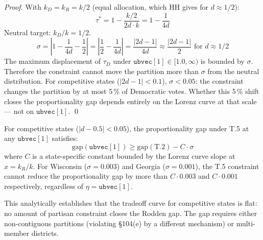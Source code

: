 \begin{proof}
With $k_D = k_R = k/2$ (equal allocation, which HH gives for $d \approx 1/2$):
\[
  \tau^* = 1 - \frac{k/2}{2d \cdot k} = 1 - \frac{1}{4d}
\]
Neutral target: $k_D/k = 1/2$.
\[
  \sigma = \left|1 - \frac{1}{4d} - \frac{1}{2}\right| = \left|\frac{1}{2} - \frac{1}{4d}\right|
  = \frac{|2d-1|}{4d} \approx \frac{|2d-1|}{2} \text{ for } d \approx 1/2
\]
The maximum displacement of $\tau_D$ under $\mathtt{ubvec}[1] \in [1.0, \infty)$
is bounded by $\sigma$. Therefore the constraint cannot move the partition more
than $\sigma$ from the neutral distribution.
For competitive states ($|2d-1| < 0.1$), $\sigma < 0.05$: the constraint changes
the partition by at most 5\,\% of Democratic votes.
Whether this 5\,\% shift closes the proportionality gap depends entirely on the
Lorenz curve at that scale --- not on $\mathtt{ubvec}[1]$. \qed
\end{proof}

\begin{corollary}
For competitive states ($|d - 0.5| < 0.05$), the proportionality gap under
T.5 at any $\mathtt{ubvec}[1]$ satisfies:
\[
  \mathrm{gap}(\mathtt{ubvec}[1]) \geq \mathrm{gap}(\text{T.2}) - C \cdot \sigma
\]
where $C$ is a state-specific constant bounded by the Lorenz curve slope at $x = k_R/k$.
For Wisconsin ($\sigma = 0.003$) and Georgia ($\sigma = 0.001$), the T.5 constraint
cannot reduce the proportionality gap by more than $C \cdot 0.003$ and $C \cdot 0.001$
respectively, regardless of $\eta = \mathtt{ubvec}[1]$.

This analytically establishes that the tradeoff curve for competitive states is
flat: no amount of partisan constraint closes the Rodden gap.
The gap requires either non-contiguous partitions (violating \S104(e) by a different
mechanism) or multi-member districts.
\end{corollary}
